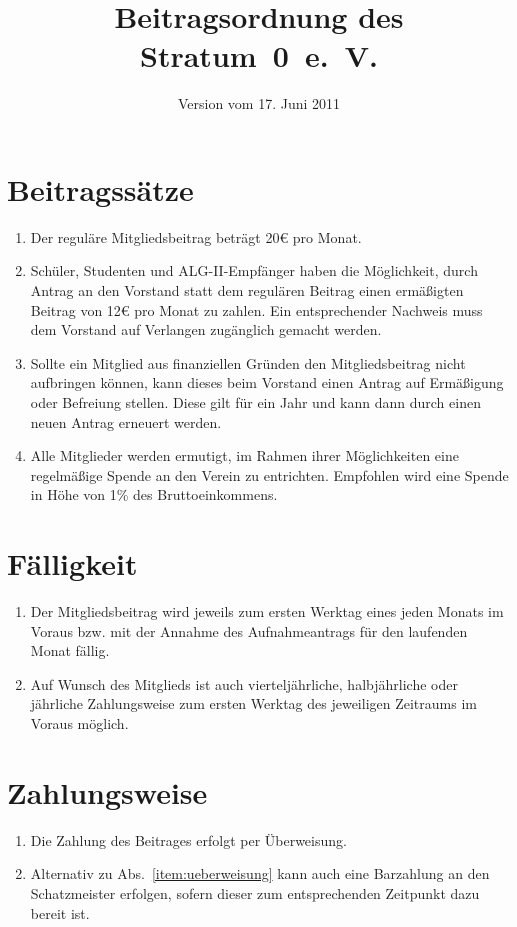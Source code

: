 \documentclass[a4paper,12pt]{scrartcl}
\title{Beitragsordnung des Stratum~0~e.~V.}
\date{Version vom 17. Juni 2011}
\begin{document}
\maketitle

\section{Beitragssätze}
\begin{enumerate}
  \item Der reguläre Mitgliedsbeitrag beträgt 20€ pro Monat.
  \item Schüler, Studenten und ALG-II-Empfänger haben die Möglichkeit, durch
    Antrag an den Vorstand statt dem regulären Beitrag einen ermäßigten Beitrag
    von 12€ pro Monat zu zahlen. Ein entsprechender Nachweis muss dem Vorstand
    auf Verlangen zugänglich gemacht werden.
  \item Sollte ein Mitglied aus finanziellen Gründen den Mitgliedsbeitrag nicht
    aufbringen können, kann dieses beim Vorstand einen Antrag auf Ermäßigung
    oder Befreiung stellen. Diese gilt für ein Jahr und kann dann durch einen
    neuen Antrag erneuert werden.
  \item Alle Mitglieder werden ermutigt, im Rahmen ihrer Möglichkeiten eine
    regelmäßige Spende an den Verein zu entrichten. Empfohlen wird eine Spende
    in Höhe von 1\% des Bruttoeinkommens.
\end{enumerate}

\section{Fälligkeit}
\begin{enumerate}
  \item Der Mitgliedsbeitrag wird jeweils zum ersten Werktag eines jeden Monats
    im Voraus bzw. mit der Annahme des Aufnahmeantrags für den laufenden Monat
    fällig.
  \item Auf Wunsch des Mitglieds ist auch vierteljährliche, halbjährliche oder
    jährliche Zahlungsweise zum ersten Werktag des jeweiligen Zeitraums im
    Voraus möglich.
\end{enumerate}

\section{Zahlungsweise}
\begin{enumerate}
  \item\label{item:ueberweisung} Die Zahlung des Beitrages erfolgt per Überweisung.
  \item Alternativ zu Abs.~\ref{item:ueberweisung} kann auch eine Barzahlung an den
    Schatzmeister erfolgen, sofern dieser zum entsprechenden Zeitpunkt dazu
    bereit ist.
\end{enumerate}
\end{document}
